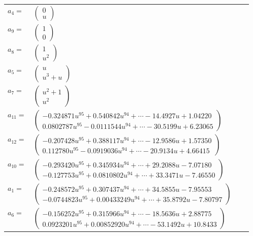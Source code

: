 \documentclass[1p]{elsarticle_modified}
\theoremstyle{definition}
\begin{document}
\begin{tabular}{m{7pt} m{180pt} m{7pt} m{180pt} }
\flushright $a_{4}=$&$\begin{pmatrix}0\\u\end{pmatrix}$ \\
\flushright $a_{9}=$&$\begin{pmatrix}1\\0\end{pmatrix}$ \\
\flushright $a_{8}=$&$\begin{pmatrix}1\\u^2\end{pmatrix}$ \\
\flushright $a_{5}=$&$\begin{pmatrix}u\\u^3+u\end{pmatrix}$ \\
\flushright $a_{7}=$&$\begin{pmatrix}u^2+1\\u^2\end{pmatrix}$ \\
\flushright $a_{11}=$&$\begin{pmatrix}-0.324871 u^{95}+0.540842 u^{94}+\cdots-14.4927 u+1.04220\\0.0802787 u^{95}-0.0111544 u^{94}+\cdots-30.5199 u+6.23065\end{pmatrix}$ \\
\flushright $a_{12}=$&$\begin{pmatrix}-0.207428 u^{95}+0.388117 u^{94}+\cdots-12.9586 u+1.57350\\0.112780 u^{95}-0.0919036 u^{94}+\cdots-20.9134 u+4.66415\end{pmatrix}$ \\
\flushright $a_{10}=$&$\begin{pmatrix}-0.293420 u^{95}+0.345934 u^{94}+\cdots+29.2088 u-7.07180\\-0.127753 u^{95}+0.0810802 u^{94}+\cdots+33.3471 u-7.46550\end{pmatrix}$ \\
\flushright $a_{1}=$&$\begin{pmatrix}-0.248572 u^{95}+0.307437 u^{94}+\cdots+34.5855 u-7.95553\\-0.0744823 u^{95}+0.00433249 u^{94}+\cdots+35.8792 u-7.80797\end{pmatrix}$ \\
\flushright $a_{6}=$&$\begin{pmatrix}-0.156252 u^{95}+0.315966 u^{94}+\cdots-18.5636 u+2.88775\\0.0923201 u^{95}+0.00852920 u^{94}+\cdots-53.1492 u+10.8433\end{pmatrix}$ \\

\end{tabular}
\end{document}
